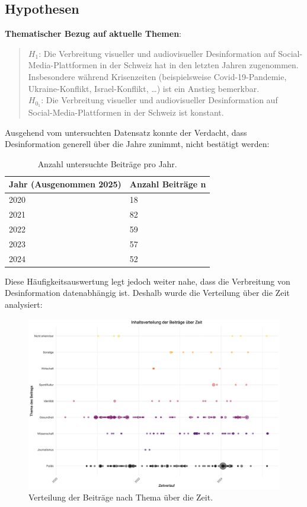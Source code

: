 \documentclass[12pt,a4paper]{article}        %
\begin{document}
\subsection{Hypothesen}
\textbf{Thematischer Bezug auf aktuelle Themen}:
\begin{quote}
  \(H_1\): Die Verbreitung visueller und audiovisueller Desinformation auf Social-Media-Plattformen in der Schweiz hat in den letzten Jahren zugenommen. Insbesondere während Krisenzeiten (beispielsweise Covid-19-Pandemie, Ukraine-Konflikt, Israel-Konflikt, …) ist ein Anstieg bemerkbar.\\
  \(H_{0_1}\): Die Verbreitung visueller und audiovisueller Desinformation auf Social-Media-Plattformen in der Schweiz ist konstant.
\end{quote}
Ausgehend vom untersuchten Datensatz konnte der Verdacht, dass Desinformation generell über die Jahre zunimmt, nicht bestätigt werden:
\begin{table}[H]
  \label{tab:results_posts_per_year}
  \centering
  \begin{tabular}{|l|l|} \hline
    \textbf{Jahr} (Ausgenommen 2025) & \textbf{Anzahl Beiträge n} \\ \hline
    2020& 18\\ \hline
    2021& 82\\ \hline
    2022& 59\\ \hline
    2023&57\\\hline
    2024&52\\\hline
  \end{tabular}
  \caption{Anzahl untersuchte Beiträge pro Jahr.}
\end{table}
Diese Häufigkeitsauswertung legt jedoch weiter nahe, dass die Verbreitung von Desinformation datenabhängig ist. Deshalb wurde die Verteilung über die Zeit analysiert:
\begin{figure}[H]
  \centering
  \includegraphics[width=1\linewidth]{images/date_dependency_plot.png}
  \caption{Verteilung der Beiträge nach Thema über die Zeit.}
  \label{fig:results_date_dependency}
\end{figure}
\end{document}
